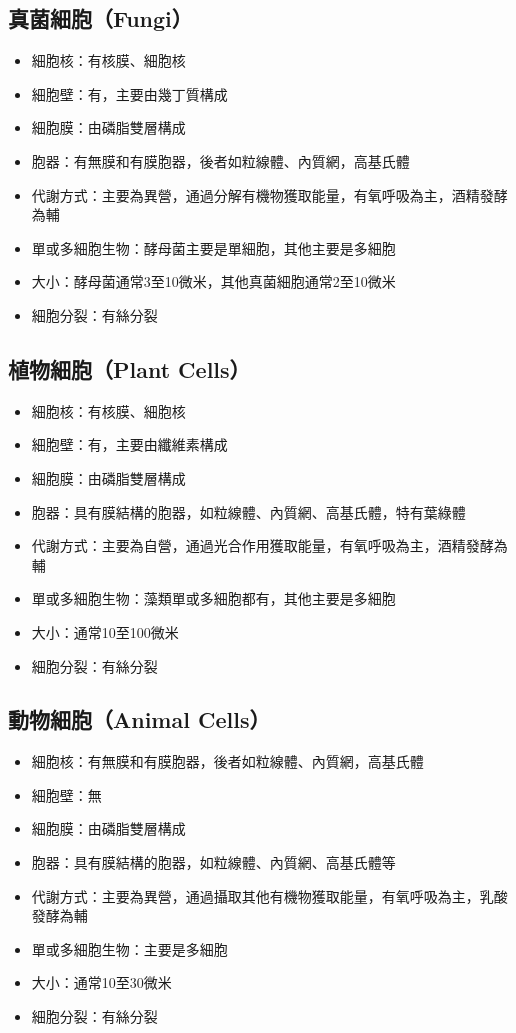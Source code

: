 \documentclass[a4paper,12pt]{report}
\begin{document}
\subsection{真菌細胞（Fungi）}
\begin{itemize}
  \item 細胞核：有核膜、細胞核
  \item 細胞壁：有，主要由幾丁質構成
  \item 細胞膜：由磷脂雙層構成
  \item 胞器：有無膜和有膜胞器，後者如粒線體、內質網，高基氏體
  \item 代謝方式：主要為異營，通過分解有機物獲取能量，有氧呼吸為主，酒精發酵為輔
  \item 單或多細胞生物：酵母菌主要是單細胞，其他主要是多細胞
  \item 大小：酵母菌通常3至10微米，其他真菌細胞通常2至10微米
  \item 細胞分裂：有絲分裂
\end{itemize}
\subsection{植物細胞（Plant Cells）}
\begin{itemize}
  \item 細胞核：有核膜、細胞核
  \item 細胞壁：有，主要由纖維素構成
  \item 細胞膜：由磷脂雙層構成
  \item 胞器：具有膜結構的胞器，如粒線體、內質網、高基氏體，特有葉綠體
  \item 代謝方式：主要為自營，通過光合作用獲取能量，有氧呼吸為主，酒精發酵為輔
  \item 單或多細胞生物：藻類單或多細胞都有，其他主要是多細胞
  \item 大小：通常10至100微米
  \item 細胞分裂：有絲分裂
\end{itemize}
\subsection{動物細胞（Animal Cells）}
\begin{itemize}
  \item 細胞核：有無膜和有膜胞器，後者如粒線體、內質網，高基氏體
  \item 細胞壁：無
  \item 細胞膜：由磷脂雙層構成
  \item 胞器：具有膜結構的胞器，如粒線體、內質網、高基氏體等
  \item 代謝方式：主要為異營，通過攝取其他有機物獲取能量，有氧呼吸為主，乳酸發酵為輔
  \item 單或多細胞生物：主要是多細胞
  \item 大小：通常10至30微米
  \item 細胞分裂：有絲分裂
\end{itemize}
\end{document}
